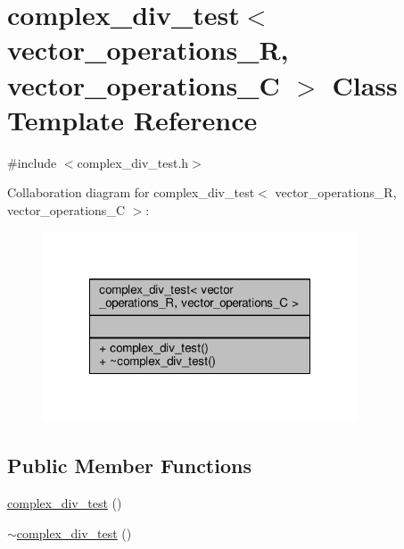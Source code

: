 \hypertarget{classcomplex__div__test}{\section{complex\-\_\-div\-\_\-test$<$ vector\-\_\-operations\-\_\-\-R, vector\-\_\-operations\-\_\-\-C $>$ Class Template Reference}
\label{classcomplex__div__test}
}


{\ttfamily \#include $<$complex\-\_\-div\-\_\-test.\-h$>$}



Collaboration diagram for complex\-\_\-div\-\_\-test$<$ vector\-\_\-operations\-\_\-\-R, vector\-\_\-operations\-\_\-\-C $>$\-:\nopagebreak
\begin{figure}[H]
\begin{center}
\leavevmode
\includegraphics[width=264pt]{classcomplex__div__test__coll__graph}
\end{center}
\end{figure}
\subsection*{Public Member Functions}
\begin{DoxyCompactItemize}
\item 
\hyperlink{classcomplex__div__test_a3d35997bd401baeaaa5465d9b2501c04}{complex\-\_\-div\-\_\-test} ()
\item 
\hyperlink{classcomplex__div__test_a35749261def21774893118c1bdde22e8}{$\sim$complex\-\_\-div\-\_\-test} ()
\end{DoxyCompactItemize}


